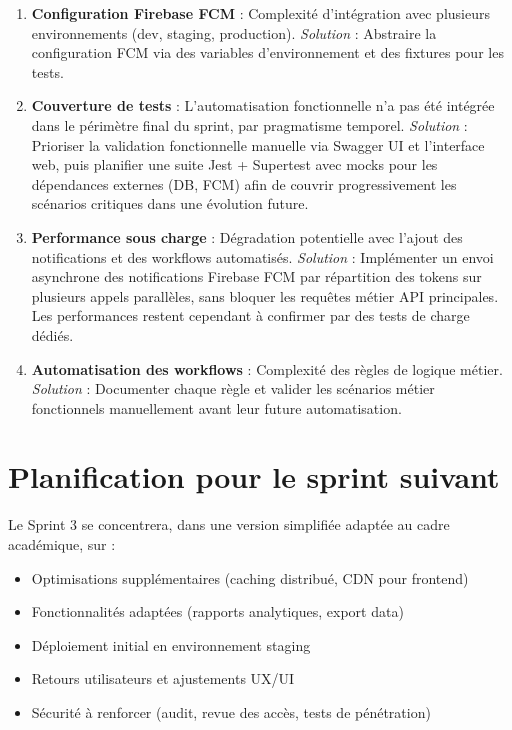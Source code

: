 \begin{enumerate}
    \item \textbf{Configuration Firebase FCM} : Complexité d'intégration avec plusieurs environnements (dev, staging, production). \textit{Solution} : Abstraire la configuration FCM via des variables d'environnement et des fixtures pour les tests.
    
    \item \textbf{Couverture de tests} : L'automatisation fonctionnelle n'a pas été intégrée dans le périmètre final du sprint, par pragmatisme temporel. \textit{Solution} : Prioriser la validation fonctionnelle manuelle via Swagger UI et l'interface web, puis planifier une suite Jest + Supertest avec mocks pour les dépendances externes (DB, FCM) afin de couvrir progressivement les scénarios critiques dans une évolution future.
    
    \item \textbf{Performance sous charge} : Dégradation potentielle avec l'ajout des notifications et des workflows automatisés. \textit{Solution} : Implémenter un envoi asynchrone des notifications Firebase FCM par répartition des tokens sur plusieurs appels parallèles, sans bloquer les requêtes métier API principales. Les performances restent cependant à confirmer par des tests de charge dédiés.
    
    \item \textbf{Automatisation des workflows} : Complexité des règles de logique métier. \textit{Solution} : Documenter chaque règle et valider les scénarios métier fonctionnels manuellement avant leur future automatisation.
\end{enumerate}

\section{Planification pour le sprint suivant}
\label{sec:plan_sprint3}

Le Sprint 3 se concentrera, dans une version simplifiée adaptée au cadre académique, sur :

\begin{itemize}
    \item Optimisations supplémentaires (caching distribué, CDN pour frontend)
    \item Fonctionnalités adaptées (rapports analytiques, export data)
    \item Déploiement initial en environnement staging
    \item Retours utilisateurs et ajustements UX/UI
    \item Sécurité à renforcer (audit, revue des accès, tests de pénétration)
\end{itemize}

